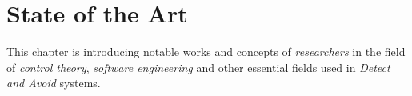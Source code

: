 \cleardoublepage
\chapter{State of the Art}\label{ch:stateOfArt}

\noindent This  chapter is introducing notable works and concepts of \emph{researchers} in the field of \emph{control theory}, \emph{software engineering} and other essential fields used in \emph{Detect and Avoid} systems.